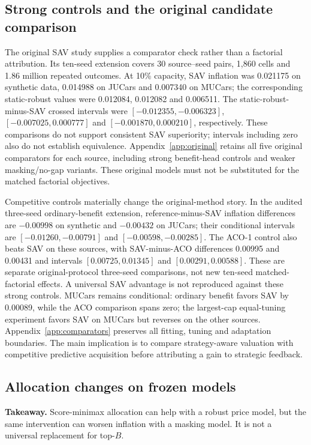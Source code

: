 \documentclass[11pt]{article}
\begin{document}
\subsection{Strong controls and the original candidate comparison}
The original SAV study supplies a comparator check rather than a factorial
attribution. Its ten-seed extension covers 30 source--seed pairs, 1,860 cells
and 1.86 million repeated outcomes. At 10\% capacity, SAV inflation was
0.021175 on synthetic data, 0.014988 on JUCars and 0.007340 on MUCars; the
corresponding static-robust values were 0.012084, 0.012082 and 0.006511.
The static-robust-minus-SAV crossed intervals were
$[-0.012355,-0.006323]$, $[-0.007025,0.000777]$ and $[-0.001870,0.000210]$,
respectively. These comparisons do not support consistent SAV superiority;
intervals including zero also do not establish equivalence. Appendix~\ref{app:original}
retains all five original comparators for each source, including strong
benefit-head controls and weaker masking/no-gap variants. These original models
must not be substituted for the matched factorial objectives.

Competitive controls materially change the original-method story. In the
audited three-seed ordinary-benefit extension, reference-minus-SAV inflation
differences are $-0.00998$ on synthetic and $-0.00432$ on JUCars; their conditional
intervals are $[-0.01260,-0.00791]$ and $[-0.00598,-0.00285]$. The ACO-1 control
also beats SAV on these sources, with SAV-minus-ACO differences 0.00995 and
0.00431 and intervals $[0.00725,0.01345]$ and $[0.00291,0.00588]$.
These are separate original-protocol three-seed comparisons, not new
ten-seed matched-factorial effects. A universal SAV advantage is not reproduced
against these strong controls. MUCars remains conditional: ordinary benefit
favors SAV by 0.00089, while the ACO comparison spans zero; the largest-cap
equal-tuning experiment favors SAV on MUCars but reverses on the other sources.
Appendix~\ref{app:comparators} preserves all fitting, tuning and adaptation
boundaries. The main implication is to compare strategy-aware valuation with
competitive predictive acquisition before attributing a gain to strategic
feedback.

\subsection{Allocation changes on frozen models}
\noindent\textbf{Takeaway.} Score-minimax allocation can help with a robust
price model, but the same intervention can worsen inflation with a masking
model. It is not a universal replacement for top-$B$.
\end{document}
